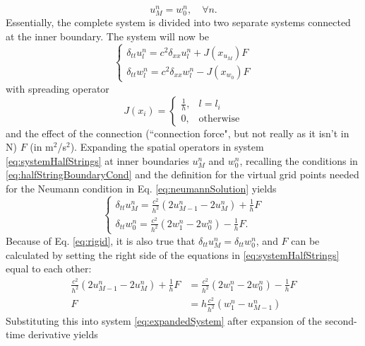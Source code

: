 \documentclass[dvipsnames, reprint]{JASA}
\def\SWcomment[#1]{\textcolor{Bittersweet}{#1}}
\begin{document}
\begin{equation}\label{eq:rigid}
    u_M^n = w_0^n,\quad \forall n.
\end{equation}
Essentially, the complete system is divided into two separate systems connected at the inner boundary. The system will now be
\begin{equation}
    \begin{cases}\label{eq:systemHalfStrings}
        \delta_{tt}u_l^n = c^2\delta_{xx}u_l^n + J(x_{u_M})F\\
        \delta_{tt}w_l^n = c^2\delta_{xx}w_l^n - J(x_{w_0})F
    \end{cases}
\end{equation}
with spreading operator
\begin{equation}
    J(x_i) =
    \begin{cases}
        \frac{1}{h}, & l = l_i\\
        0,& \text{otherwise}
    \end{cases}
\end{equation}
and the effect of the connection \SWcomment[(``connection force", but not really as it isn't in N)] $F$ (in m$^2$/s$^2$).
%
Expanding the spatial operators in system \eqref{eq:systemHalfStrings} at inner boundaries $u_M^n$ and $w_0^n$, recalling the conditions in  \eqref{eq:halfStringBoundaryCond} and the definition for the virtual grid points needed for the Neumann condition in Eq. \eqref{eq:neumannSolution} yields
\begin{equation}\label{eq:expandedSystem}
    \begin{cases}
        \delta_{tt}u_M^n = \frac{c^2}{h^2}(2u_{M-1}^n-2u_M^n) + \frac{1}{h}F\\
        \delta_{tt}w_0^n = \frac{c^2}{h^2}(2w_1^n-2w_0^n) - \frac{1}{h}F.
    \end{cases}
\end{equation}
Because of Eq. \eqref{eq:rigid}, it is also true that $\delta_{tt}u_M^n = \delta_{tt}w_0^n$, and $F$ can be calculated by setting the \SWcomment[right side of the] equations in \eqref{eq:systemHalfStrings} equal to each other:
\begin{align}
     \frac{c^2}{h^2}(2u_{M-1}^n-2u_M^n) + \frac{1}{h} F&= 
     \frac{c^2}{h^2}(2w_1^n-2w_0^n) - \frac{1}{h} F\nonumber\\
    F &= h \frac{c^2}{h^2}(w_1^n - u_{M-1}^n)
\end{align}
Substituting this into system \eqref{eq:expandedSystem} after expansion of the second-time derivative yields
\end{document}
